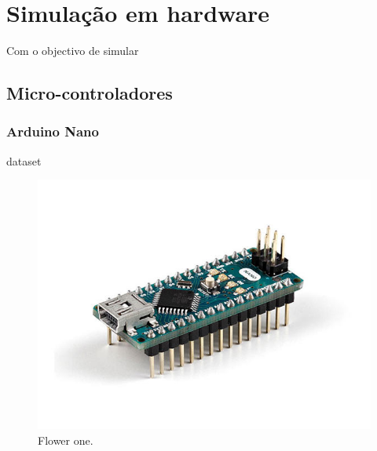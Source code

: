 
\chapter{Simulação em hardware}

Com o objectivo de simular 


\section{Micro-controladores}

\subsection{Arduino Nano}

dataset 



\begin{figure}[!tbp]
	\centering
	\begin{minipage}[b]{0.4\textwidth}
		\includegraphics[width=\textwidth]{img/hardware/nano-img.jpg}
		\caption{Flower one.}
	\end{minipage}
	\hfill
	\begin{minipage}[b]{0.4\textwidth}

\end{minipage}
\end{figure}
